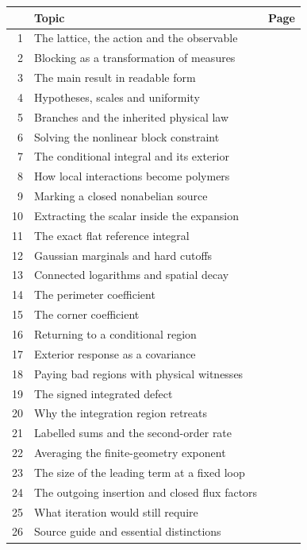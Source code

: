 \documentclass[11pt,a4paper]{article}
\begin{document}
\vspace{5pt}
\begin{tabularx}{\textwidth}{@{}rXr@{}}
    \toprule
    & \textbf{Topic} & \textbf{Page}\\
    \midrule
    1 & The lattice, the action and the observable & \pageref{summary:1}\\
    2 & Blocking as a transformation of measures & \pageref{summary:2}\\
    3 & The main result in readable form & \pageref{summary:3}\\
    4 & Hypotheses, scales and uniformity & \pageref{summary:4}\\
    5 & Branches and the inherited physical law & \pageref{summary:5}\\
    6 & Solving the nonlinear block constraint & \pageref{summary:6}\\
    7 & The conditional integral and its exterior & \pageref{summary:7}\\
    8 & How local interactions become polymers & \pageref{summary:8}\\
    9 & Marking a closed nonabelian source & \pageref{summary:9}\\
    10 & Extracting the scalar inside the expansion & \pageref{summary:10}\\
    11 & The exact flat reference integral & \pageref{summary:11}\\
    12 & Gaussian marginals and hard cutoffs & \pageref{summary:12}\\
    13 & Connected logarithms and spatial decay & \pageref{summary:13}\\
    14 & The perimeter coefficient & \pageref{summary:14}\\
    15 & The corner coefficient & \pageref{summary:15}\\
    16 & Returning to a conditional region & \pageref{summary:16}\\
    17 & Exterior response as a covariance & \pageref{summary:17}\\
    18 & Paying bad regions with physical witnesses & \pageref{summary:18}\\
    19 & The signed integrated defect & \pageref{summary:19}\\
    20 & Why the integration region retreats & \pageref{summary:20}\\
    21 & Labelled sums and the second-order rate & \pageref{summary:21}\\
    22 & Averaging the finite-geometry exponent & \pageref{summary:22}\\
    23 & The size of the leading term at a fixed loop & \pageref{summary:23}\\
    24 & The outgoing insertion and closed flux factors & \pageref{summary:24}\\
    25 & What iteration would still require & \pageref{summary:25}\\
    26 & Source guide and essential distinctions & \pageref{summary:26}\\
    \bottomrule
\end{tabularx}
\end{document}
